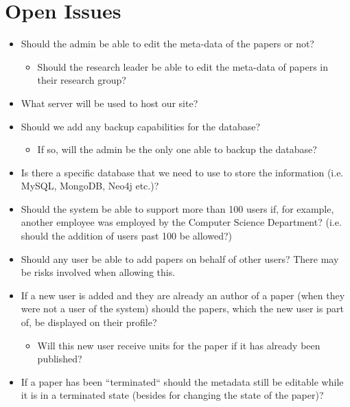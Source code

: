 \documentclass[a4paper,12pt]{article}
\begin{document}
\newpage
\section{Open Issues}

\begin{itemize}	
\item Should the admin be able to edit the meta-data of the papers or not?
	\begin{itemize}
	\item Should the research leader be able to edit the meta-data of papers in their research group?
	\end{itemize}
\item What server will be used to host our site? 
\item Should we add any backup capabilities for the database?
	\begin{itemize}
	\item If so, will the admin be the only one able to backup the database?
	\end{itemize}
\item Is there a specific database that we need to use to store the information (i.e. MySQL, MongoDB, Neo4j etc.)?
\item Should the system be able to support more than 100 users if, for example, another employee was employed by the Computer Science Department? (i.e. should the addition of users past 100 be allowed?)
\item Should any user be able to add papers on behalf of other users? There may be risks involved when allowing this.
\item If a new user is added and they are already an author of a paper (when they were not a user of the system) should the papers, which the new user is part of, be displayed on their profile?
	\begin{itemize}
	\item Will this new user receive units for the paper if it has already been published?
	\end{itemize}
\item If a paper has been ``terminated`` should the metadata still be editable while it is in a terminated state (besides for changing the state of the paper)?
\end{itemize}
\end{document}
